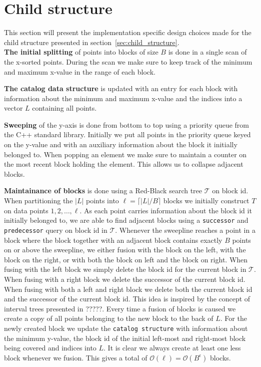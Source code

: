 \documentclass[twoside,11pt,openright]{report}
\begin{document}

\section{Child structure}
This section will present the implementation specific design choices made for the child structure presented in section~\ref{sec:child_structure}. \\

\textbf{The initial splitting} of points into blocks of size $B$ is done in a single scan of the x-sorted points. During the scan we make sure to keep track of the minimum and maximum x-value in the range of each block.

\textbf{The catalog data structure} is updated with an entry for each block with information about the minimum and maximum x-value and the indices into a vector $L$ containing all points.

\textbf{Sweeping} of the y-axis is done from bottom to top using a priority queue from the C++ standard library. Initially we put all points in the priority queue keyed on the y-value and with an auxiliary information about the block it initially belonged to. When popping an element we make sure to maintain a counter on the most recent block holding the element. This allows us to collapse adjacent blocks.

\textbf{Maintainance of blocks} is done using a Red-Black search tree $\mathcal{T}$ on block id. When partitioning the $\vert L \vert$ points into $\ell = \lceil\lvert L \lvert / B\rceil$ blocks we initially construct $T$ on data points $1, 2, \dots, \ell$. As each point carries information about the block id it initially belonged to, we are able to find adjacent blocks using a \texttt{successor} and \texttt{predecessor} query on block id in $\mathcal{T}$. Whenever the sweepline reaches a point in a block where the block together with an adjacent block contains exactly $B$ points on or above the sweepline, we either fusion with the block on the left, with the block on the right, or with both the block on left and the block on right. When fusing with the left block we simply delete the block id for the current block in $\mathcal{T}$. When fusing with a right block we delete the successor of the current block id. When fusing with both a left and right block we delete both the current block id and the successor of the current block id. This idea is inspired by the concept of interval trees presented in ?????. %
Every time a fusion of blocks is caused we create a copy of all points belonging to the new block to the back of $L$. For the newly created block we update the \texttt{catalog structure} with information about the minimum y-value, the block id of the initial left-most and right-most block being covered and indices into $L$.
It is clear we always create at least one less block whenever we fusion. This gives a total of $\mathcal{O}(\ell) = \mathcal{O}(B^{\epsilon})$ blocks.
\end{document}
